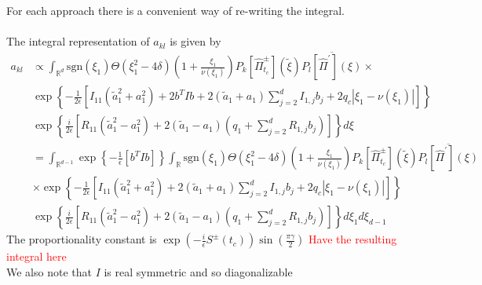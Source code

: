 For each approach there is a convenient way of re-writing the integral.
\\
\\
The integral representation of $a_{kl}$ is given by  
\begin{equation}
  \begin{split}
    a_{kl} &\propto 
    \int_{\mathbb{R}^{d}} \text{sgn}(\xi_1)
      \Theta(\xi_1^2 - 4\delta)\left( 1 + \frac{\xi_1}{\nu(\xi_1)} \right)
      P_k[\hat{\Pi}^{\pm}_{t_c}](\tilde{\xi})
      \overline{ P_l[\hat{\Pi}^\prime](\xi)} 
      \times 
      \\
      &
      \exp{\left\{
    -\frac{1}{2\epsilon}\left[ 
      I_{11}(\tilde{a}_1^2 + a_1^2) 
      + 2b^T I b + 2(\tilde{a}_1 + a_1)\sum_{j = 2}^d I_{1,j} b_j
    + 2q_c |\xi_1 - \nu(\xi_1)| 
    \right]
      \right\} }
    \\
    &
    \exp{\left\{
    \frac{i}{2\epsilon}\left[ 
      R_{11} (\tilde{a}_1^2 - a_1^2)  
      + 2(\tilde{a}_1 - a_1)\left(q_1 + \sum_{j=2}^d R_{1,j} b_j\right) 
    \right]
      \right\} }  d\xi
  \\
    &=\int_{\mathbb{R}^{d-1}}  
      \exp{\left\{
    -\frac{1}{\epsilon}\left[ 
       b^T I b 
    \right]
      \right\} }
      \int_{\mathbb{R}} \text{sgn}(\xi_1)
      \Theta(\xi_1^2 - 4\delta)\left( 1 + \frac{\xi_1}{\nu(\xi_1)} \right)
      P_k[\hat{\Pi}^{\pm}_{t_c}](\tilde{\xi})
      \overline{ P_l[\hat{\Pi}^\prime](\xi)} 
      \\
      &
      \times 
      \exp{\left\{
    -\frac{1}{2\epsilon}\left[ 
      I_{11}(\tilde{a}_1^2 + a_1^2) 
       + 2(\tilde{a}_1 + a_1)\sum_{j = 2}^d I_{1,j} b_j
    + 2q_c |\xi_1 - \nu(\xi_1)| 
    \right]
      \right\} }
    \\
    &
    \exp{\left\{
    \frac{i}{2\epsilon}\left[ 
      R_{11} (\tilde{a}_1^2 - a_1^2)  
      + 2(\tilde{a}_1 - a_1)\left(q_1 + \sum_{j=2}^d R_{1,j} b_j\right) 
    \right]
\right\} }  d\xi_1d\xi_{d-1}
  \end{split}
\end{equation}
The proportionality constant is $\exp{\left( -\frac{i}{\epsilon} S^{\pm}(t_c) \right)} \sin(\frac{\pi \gamma}{2})$
\textcolor{red}{Have the resulting integral here}
\\
We also note that $I$ is real symmetric and so diagonalizable
%
%
%
%
